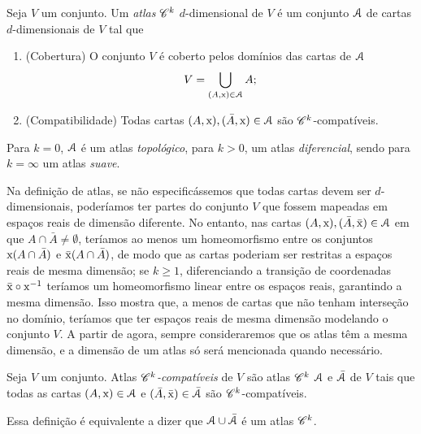 \begin{defi}
Seja $V$ um conjunto. Um \emph{atlas} $\mathscr{C}^k$ $d$-dimensional de $V$ é um conjunto $\mathcal{A}$ de cartas $d$-dimensionais de $V$ tal que
	\begin{enumerate}
	\item (Cobertura) O conjunto $V$ é coberto pelos domínios das cartas de $\mathcal{A}$
	\begin{equation*}
	V = \displaystyle\bigcup_{(A,\mathrm{x}) \in \mathcal{A}} A;
	\end{equation*}
	\item (Compatibilidade) Todas cartas $(A,\mathrm{x}), (\bar A,\mathrm{x}) \in \mathcal{A}$  são $\mathscr{C}^k$-compatíveis.
	\end{enumerate}
Para $k=0$, $\mathcal{A}$ é um atlas \emph{topológico}, para $k>0$, um atlas \emph{diferencial}, sendo para $k=\infty$ um atlas \emph{suave}.
\end{defi}

Na definição de atlas, se não especificássemos que todas cartas devem ser $d$-dimensionais, poderíamos ter partes do conjunto $V$ que fossem mapeadas em espaços reais de dimensão diferente. No entanto, nas cartas $(A,\mathrm{x}), (\bar A,\bar {\mathrm{x}}) \in \mathcal{A}$ em que $A \cap \bar A \neq \emptyset$, teríamos ao menos um homeomorfismo entre os conjuntos $\mathrm{x}(A \cap \bar A)$ e $\bar{\mathrm{x}}(A \cap \bar A)$, de modo que as cartas poderiam ser restritas a espaços reais de mesma dimensão; se $k \geq 1$, diferenciando a transição de coordenadas $\bar{\mathrm{x}} \circ \mathrm{x}^{-1}$ teríamos um homeomorfismo linear entre os espaços reais, garantindo a mesma dimensão. Isso mostra que, a menos de cartas que não tenham interseção no domínio, teríamos que ter espaços reais de mesma dimensão modelando o conjunto $V$. A partir de agora, sempre consideraremos que os atlas têm a mesma dimensão, e a dimensão de um atlas só será mencionada quando necessário.

\begin{defi}
Seja $V$ um conjunto. Atlas \emph{$\mathscr{C}^k$-compatíveis} de $V$ são atlas $\mathscr{C}^k$ $\mathcal{A}$ e $\bar{\mathcal{A}}$ de $V$ tais que todas as cartas $(A,\mathrm{x}) \in \mathcal{A}$ e $(\bar A,\bar{\mathrm{x}}) \in \bar {\mathcal{A}}$ são $\mathscr{C}^k$-compatíveis.
\end{defi}

Essa definição é equivalente a dizer que $\mathcal{A} \cup \bar {\mathcal{A}}$ é um atlas $\mathscr{C}^k$.

